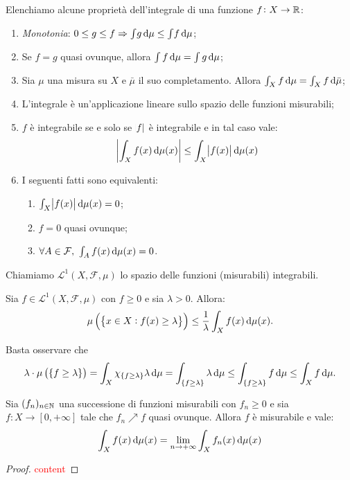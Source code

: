 Elenchiamo alcune proprietà dell'integrale di una funzione $ f\colon X\to \mathbb{R} $:
\begin{enumerate}
    \item \emph{Monotonia}: $ 0 \leq g \leq f \Rightarrow \int\! g\dif\mu \leq \int\! f\dif\mu $;
    \item \label{it:quasi_ovunque}Se $ f=g $ quasi ovunque, allora $ \int f\dif\mu = \int g\dif\mu $;
    \item Sia $ \mu $ una misura su $ X $ e $ \bar{\mu} $ il suo completamento. Allora $ \int_X f\dif\mu = \int_X f\dif\bar{\mu} $;
    \item L'integrale è un'applicazione lineare sullo spazio delle funzioni misurabili;
    \item $ f $ è integrabile se e solo se $ \abs{f} $ è integrabile e in tal caso vale:
    \[ \abs{ \int_X f(x)\dif\mu(x)} \leq \int_X \abs{f(x)}\dif\mu(x) \]
    \item I seguenti fatti sono equivalenti:
    \begin{enumerate}[label=(\roman*)]
        \item $ \int_X \abs{f(x)}\dif\mu(x) = 0$;
        \item $ f = 0 $ quasi ovunque;
        \item $ \forall A\in\mathcal{F}, \ \int_A f(x)\dif\mu(x) = 0 $.
    \end{enumerate}
\end{enumerate}

\begin{definition}
    Chiamiamo $ \mathscr{L}^1(X,\mathcal{F},\mu) $ lo spazio delle funzioni (misurabili) integrabili.
\end{definition}

\begin{exercise}
    Sia $ f\in\mathscr{L}^1(X,\mathcal{F},\mu) $ con $ f\geq 0 $ e sia $ \lambda > 0 $. Allora:
    \[ \mu\left( \left\{ x\in X : f(x) \ge \lambda \right\}  \right) \leq \frac{1}{\lambda}\int_X f(x)\dif\mu(x). \]
\end{exercise}
\begin{solution}
    Basta osservare che 
    \[
        \lambda \cdot \mu\left( \{ f \geq \lambda \} \right) = \int_X \chi_{ \{f\geq\lambda \} } \lambda \dif\mu = \int_{ \{ f \geq \lambda \} } \lambda \dif\mu \leq \int_{ \{ f \geq \lambda \} } f\dif\mu \leq \int_X f\dif\mu. 
    \] 
\end{solution}

\begin{thm}
    Sia $ (f_n)_{n\in\mathbb{N}} $ una successione di funzioni misurabili con $ f_n \geq 0 $ e sia $ f\colon X\to[0,+\infty] $ tale che $ f_n\nearrow f $ quasi ovunque. Allora $ f $ è misurabile e vale:
    \[ \int_X f(x)\dif\mu(x) = \lim_{n\to+\infty} \int_X f_n(x)\dif\mu(x) \]
\end{thm}
\begin{proof}
    \textcolor{red}{content}
\end{proof}

